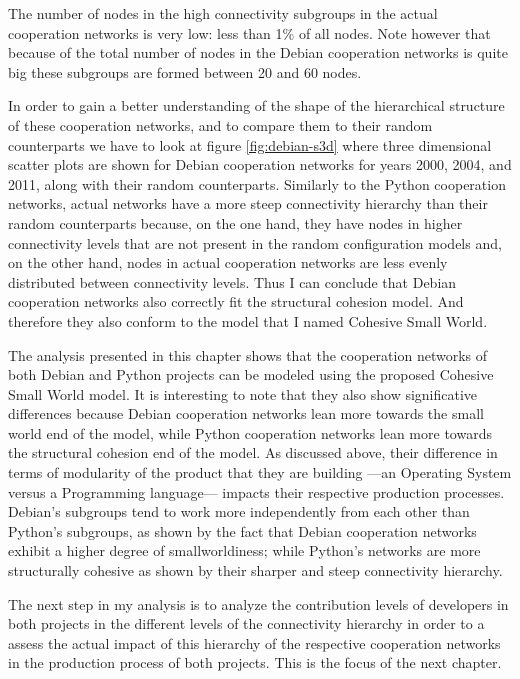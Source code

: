 The number of nodes in the high connectivity subgroups in the actual cooperation networks is very low: less than 1\% of all nodes. Note however that because of the total number of nodes in the Debian cooperation networks is quite big these subgroups are formed between 20 and 60 nodes. 

In order to gain a better understanding of the shape of the hierarchical structure of these cooperation networks, and to compare them to their random counterparts we have to look at figure \ref{fig:debian-s3d} where three dimensional scatter plots are shown for Debian cooperation networks for years 2000, 2004, and 2011, along with their random counterparts. Similarly to the Python cooperation networks, actual networks have a more steep connectivity hierarchy than their random counterparts because, on the one hand, they have nodes in higher connectivity levels that are not present in the random configuration models and, on the other hand, nodes in actual cooperation networks are less evenly distributed between connectivity levels. Thus I can conclude that Debian cooperation networks also correctly fit the structural cohesion model. And therefore they also conform to the model that I named Cohesive Small World.

The analysis presented in this chapter shows that the cooperation networks of both Debian and Python projects can be modeled using the proposed Cohesive Small World model. It is interesting to note that they also show significative differences because Debian cooperation networks lean more towards the small world end of the model, while Python cooperation networks lean more towards the structural cohesion end of the model. As discussed above, their difference in terms of modularity of the product that they are building ---an Operating System versus a Programming language--- impacts their respective production processes. Debian's subgroups tend to work more independently from each other than Python's subgroups, as shown by the fact that Debian cooperation networks exhibit a higher degree of smallworldiness; while Python's networks are more structurally cohesive as shown by their sharper and steep connectivity hierarchy.

The next step in my analysis is to analyze the contribution levels of developers in both projects in the different levels of the connectivity hierarchy in order to a assess the actual impact of this hierarchy of the respective cooperation networks in the production process of both projects. This is the focus of the next chapter.


